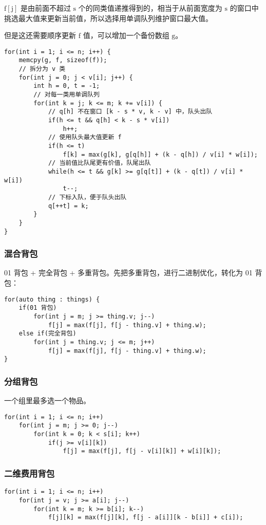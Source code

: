\documentclass[UTF8]{article}
\begin{document}
$\mathrm{f[j]}$ 是由前面不超过 $\mathrm{s}$ 个的同类值递推得到的，相当于从前面宽度为 $\mathrm{s}$ 的窗口中挑选最大值来更新当前值，所以选择用单调队列维护窗口最大值。

但是这还需要顺序更新 $\mathrm{f}$ 值，可以增加一个备份数组 $\mathrm{g}$。
\begin{lstlisting}[caption=多重背包单调队列优化]
for(int i = 1; i <= n; i++) {
	memcpy(g, f, sizeof(f));
	// 拆分为 v 类
	for(int j = 0; j < v[i]; j++) {
		int h = 0, t = -1;
		// 对每一类用单调队列
		for(int k = j; k <= m; k += v[i]) {
			// q[h] 不在窗口 [k - s * v, k - v] 中，队头出队
			if(h <= t && q[h] < k - s * v[i])
				h++;
			// 使用队头最大值更新 f
			if(h <= t)
				f[k] = max(g[k], g[q[h]] + (k - q[h]) / v[i] * w[i]);
			// 当前值比队尾更有价值，队尾出队
			while(h <= t && g[k] >= g[q[t]] + (k - q[t]) / v[i] * w[i])
				t--;
			// 下标入队，便于队头出队
			q[++t] = k;
		}
	}
}
\end{lstlisting}


\subsubsection{混合背包}
01 背包 + 完全背包 + 多重背包。先把多重背包，进行二进制优化，转化为 01 背包：
\begin{lstlisting}[caption=混合背包]
for(auto thing : things) {
	if(01 背包)
		for(int j = m; j >= thing.v; j--)
			f[j] = max(f[j], f[j - thing.v] + thing.w);
	else if(完全背包)
		for(int j = thing.v; j <= m; j++)
			f[j] = max(f[j], f[j - thing.v] + thing.w);
}
\end{lstlisting}


\subsubsection{分组背包}
一个组里最多选一个物品。
\begin{lstlisting}[caption=分组背包]
for(int i = 1; i <= n; i++)
	for(int j = m; j >= 0; j--)
		for(int k = 0; k < s[i]; k++)
			if(j >= v[i][k])
				f[j] = max(f[j], f[j - v[i][k]] + w[i][k]);
\end{lstlisting}


\subsubsection{二维费用背包}
\begin{lstlisting}[caption=二维费用背包]
for(int i = 1; i <= n; i++) 
	for(int j = v; j >= a[i]; j--)
		for(int k = m; k >= b[i]; k--)
			f[j][k] = max(f[j][k], f[j - a[i]][k - b[i]] + c[i]);
\end{lstlisting}
\end{document}
